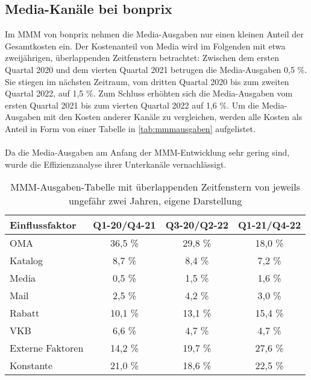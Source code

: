 \subsection{Media-Kanäle bei bonprix} 
\label{MMMbeiBonprix}
Im \ac{MMM} von bonprix nehmen die Media-Ausgaben nur einen kleinen Anteil der Gesamtkosten ein. Der Kostenanteil von Media wird im Folgenden mit etwa zweijährigen, überlappenden Zeitfenstern betrachtet: Zwischen dem ersten Quartal 2020 und dem vierten Quartal 2021 betrugen die Media-Ausgaben 0,5 \%. Sie stiegen im nächsten Zeitraum, vom dritten Quartal 2020 bis zum zweiten Quartal 2022, auf 1,5 \%. Zum Schluss erhöhten sich die Media-Ausgaben vom ersten Quartal 2021 bis zum vierten Quartal 2022 auf 1,6 \%. Um die Media-Ausgaben mit den Kosten anderer Kanäle zu vergleichen, werden alle Kosten als Anteil in Form von einer Tabelle in \autoref{tab:mmmausgaben} aufgelistet. \\\\
Da die Media-Ausgaben am Anfang der \ac{MMM}-Entwicklung sehr gering sind, wurde die Effizienzanalyse ihrer Unterkanäle vernachlässigt.  
\begin{table}[h!]
\centering
\renewcommand{\arraystretch}{1.3}
\setlength{\tabcolsep}{10pt}
\begin{tabular}{|l|c|c|c|}
\hline
\textbf{Einflussfaktor} & \textbf{Q1-20/Q4-21} & \textbf{Q3-20/Q2-22} & \textbf{Q1-21/Q4-22} \\ \hline
OMA                    & 36,5 \%               & 29,8 \%               & 18,0 \%               \\ \hline
Katalog                & 8,7 \%                & 8,4 \%                & 7,2 \%                \\ \hline
Media                  & 0,5 \%                & 1,5 \%                & 1,6 \%                \\ \hline
Mail                   & 2,5 \%                & 4,2 \%                & 3,0 \%                \\ \hline
Rabatt                 & 10,1 \%               & 13,1 \%               & 15,4 \%               \\ \hline
VKB                    & 6,6 \%                & 4,7 \%                & 4,7 \%                \\ \hline
Externe Faktoren       & 14,2 \%               & 19,7 \%               & 27,6 \%               \\ \hline
Konstante              & 21,0 \%               & 18,6 \%               & 22,5 \%               \\ \hline
\end{tabular}
\caption{\ac{MMM}-Ausgaben-Tabelle mit überlappenden Zeitfenstern von jeweils ungefähr zwei Jahren, eigene Darstellung}
\label{tab:mmmausgaben}
\end{table}

